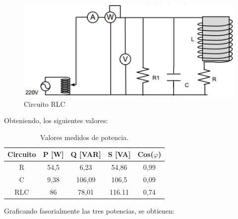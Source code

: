 \documentclass[a4paper]{article}
\begin{document}
\begin{figure}[H]
\centering
\begin{minipage}{.5\textwidth}
  \centering
  \includegraphics[width=.8\linewidth]{Circuito-ejercicio-2C}
  \caption{Circuito RLC}
  \label{fig:2b}
\end{minipage}
\end{figure}

Obteniendo, los siguientes valores:

\begin{table}[H]
\centering
\begin{tabular}{|c|c|c|c|c|}
\hline
\textbf{Circuito} & \textbf{P {[}W{]}} & \textbf{Q {[}VAR{]}} & \textbf{S {[}VA{]}} & \textbf{Cos($\varphi$)} \\ \hline
R                 & 54,5               & 6,23                 & 54,86                & 0,99                                \\ \hline
C                 & 9,38               & 106,09               & 106,5                & 0,09                                \\ \hline
RLC               &  86              & 78,01                & 116.11                  & 0,74                                \\ \hline
\end{tabular}
\caption{Valores medidos de potencia.}
\end{table}

Graficando fasorialmente las tres potencias, se obtienen:
\end{document}
